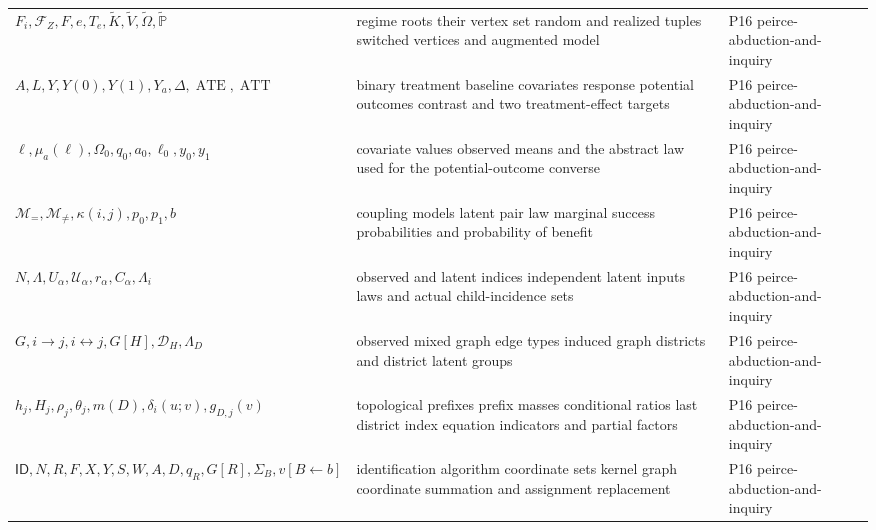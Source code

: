 \begin{longtable}{@{}p{}p{}p{}@{}}
\(F_i,\allowbreak \mathcal F_Z,\allowbreak F,\allowbreak e,\allowbreak T_e,\allowbreak \widetilde K,\allowbreak \widetilde V,\allowbreak \widetilde\Omega,\allowbreak \widetilde{\mathbb P}\) & regime roots their vertex set random and realized tuples switched vertices and augmented model & P16 peirce-\allowbreak{}abduction-\allowbreak{}and-\allowbreak{}inquiry \\
\(A,\allowbreak L,\allowbreak Y,\allowbreak Y(0),\allowbreak Y(1),\allowbreak Y_a,\allowbreak \Delta,\allowbreak \operatorname{ATE},\allowbreak \operatorname{ATT}\) & binary treatment baseline covariates response potential outcomes contrast and two treatment-effect targets & P16 peirce-\allowbreak{}abduction-\allowbreak{}and-\allowbreak{}inquiry \\
\(\ell,\allowbreak \mu_a(\ell),\allowbreak \Omega_0,\allowbreak q_0,\allowbreak a_0,\allowbreak \ell_0,\allowbreak y_0,\allowbreak y_1\) & covariate values observed means and the abstract law used for the potential-outcome converse & P16 peirce-\allowbreak{}abduction-\allowbreak{}and-\allowbreak{}inquiry \\
\(\mathcal M_=,\allowbreak \mathcal M_{\ne},\allowbreak \kappa(i,\allowbreak j),\allowbreak p_0,\allowbreak p_1,\allowbreak b\) & coupling models latent pair law marginal success probabilities and probability of benefit & P16 peirce-\allowbreak{}abduction-\allowbreak{}and-\allowbreak{}inquiry \\
\(N,\allowbreak \Lambda,\allowbreak U_\alpha,\allowbreak \mathcal U_\alpha,\allowbreak r_\alpha,\allowbreak C_\alpha,\allowbreak \Lambda_i\) & observed and latent indices independent latent inputs laws and actual child-incidence sets & P16 peirce-\allowbreak{}abduction-\allowbreak{}and-\allowbreak{}inquiry \\
\(G,\allowbreak i\to j,\allowbreak i\leftrightarrow j,\allowbreak G[H],\allowbreak \mathcal D_H,\allowbreak \Lambda_D\) & observed mixed graph edge types induced graph districts and district latent groups & P16 peirce-\allowbreak{}abduction-\allowbreak{}and-\allowbreak{}inquiry \\
\(h_j,\allowbreak H_j,\allowbreak \rho_j,\allowbreak \theta_j,\allowbreak m(D),\allowbreak \delta_i(u;\allowbreak v),\allowbreak g_{D,j}(v)\) & topological prefixes prefix masses conditional ratios last district index equation indicators and partial factors & P16 peirce-\allowbreak{}abduction-\allowbreak{}and-\allowbreak{}inquiry \\
\(\mathsf{ID},\allowbreak N,\allowbreak R,\allowbreak F,\allowbreak X,\allowbreak Y,\allowbreak S,\allowbreak W,\allowbreak A,\allowbreak D,\allowbreak q_R,\allowbreak G[R],\allowbreak \Sigma_B,\allowbreak v[B\leftarrow b]\) & identification algorithm coordinate sets kernel graph coordinate summation and assignment replacement & P16 peirce-\allowbreak{}abduction-\allowbreak{}and-\allowbreak{}inquiry \\

\end{longtable}
